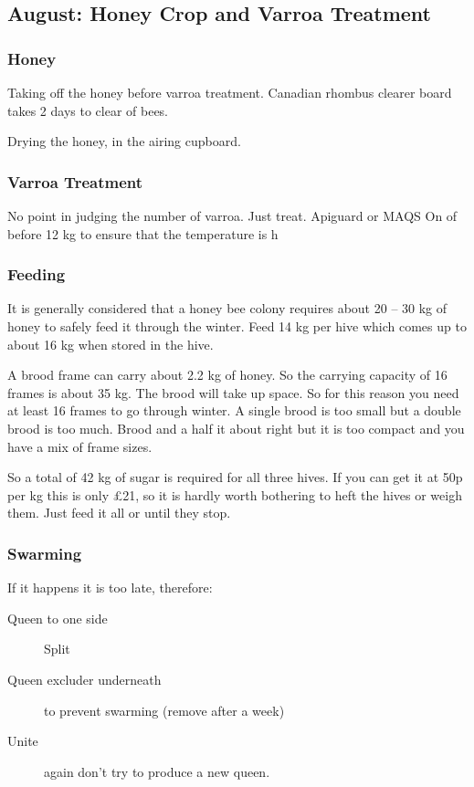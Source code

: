 \subsection{August: Honey Crop and Varroa Treatment}

\subsubsection{Honey}

Taking off the honey before varroa treatment.
Canadian rhombus clearer board takes 2 days to clear of bees.

Drying the honey,
in the airing cupboard.

\subsubsection{Varroa Treatment}

No point in judging the number of varroa.
Just treat.
Apiguard or MAQS
On of before 12 kg to ensure that the temperature is h

\subsubsection{Feeding}

 It is
generally considered that a honey bee colony requires about 20 – 30 kg of honey to
safely feed it through the winter. 
Feed 14 kg per hive
which comes up to about 16 kg when stored in the hive.

A brood frame can carry about 2.2 kg of honey.  
So the carrying capacity of 16 frames is about 35 kg.
The brood will take up space.
So for this reason you need at least 16 frames to go through winter.
A single brood is too small but a double brood is too much.
Brood and a half it about right but it is too compact
and you have a mix of frame sizes.

 So a total of 42 kg of sugar is required for all three hives.
 If you can get it at 50p per kg this is only £21,
 so it is hardly worth bothering to heft the hives or weigh them.
 Just feed it all or until they stop.
 
 \subsubsection{Swarming}

 If it happens it is too late, therefore:

 \begin{description}
     \item [Queen to one side] Split
     \item [Queen excluder underneath] to prevent swarming (remove after a week)
     \item [Unite] again don't try to produce a new queen.
 \end{description}
